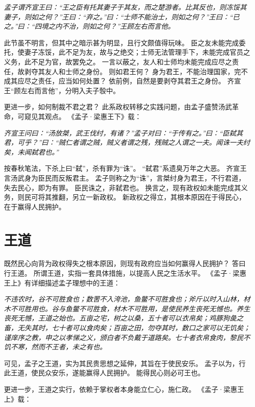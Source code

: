 \documentclass[11pt]{article}
\begin{document}
\textit{孟子谓齐宣王曰：“王之臣有托其妻子于其友，而之楚游者。比其反也，则冻馁其妻子，则如之何？”王曰：“弃之。”曰：“士师不能治士，则如之何？”王曰：“已之。”曰：“四境之内不治，则如之何？”王顾左右而言他。}

此节虽不明言，但其中之暗示甚为明显，且行文颇值得玩味。
臣之友未能完成委托，使妻子冻馁，此不足为友，故与之绝交；士师无法管理手下，未能完成官员之义务，此不足为官，故罢免之。
一言以蔽之，友人和士师均未能完成应尽之责任，故剥夺其友人和士师之身份。
则如君王何？
身为君王，不能治理国家，完不成其应尽之责任，应当如何处置？
依前例，自然是要剥夺其君王之身份。
齐宣王“顾左右而言他”，分明入夫子彀中。

\par

更进一步，如何制裁不君之君？
此系政权转移之实践问题，由孟子盛赞汤武革命，可窥见其观点。
《孟子·梁惠王下》载：

\textit{齐宣王问曰：“汤放桀，武王伐纣，有诸？”孟子对曰：“于传有之。”曰：“臣弑其君，可乎？”曰：“贼仁者谓之贼，贼义者谓之残，残贼之人谓之一夫。闻诛一夫纣矣，未闻弑君也。”}

按春秋笔法，下杀上曰“弑”，杀有罪为“诛”。
“弑君”系遗臭万年之大恶。
齐宣王言汤武身为臣民而反叛君主。
孟子则称之为“诛”，言桀纣身为君王，不行君道，失去民心，即为有罪。
臣民诛之，非弑君也。
换言之，现有政权如未能完成其义务，则民可将其推翻，另立一新政权。
新政权之得立，其根本原因在于得民心，在于赢得人民拥护。
  
\section{王道}
既然民心向背为政权得失之根本原因，则现有政府应当如何赢得人民拥护？
答曰行王道。
所谓王道，实指一套具体措施，以提高人民之生活水平。
《孟子·梁惠王上》有详细描述孟子理想中的王道：
  
\textit{不违农时，谷不可胜食也；数罟不入洿池，鱼鳖不可胜食也；斧斤以时入山林，材木不可胜用也。谷与鱼鳖不可胜食，材木不可胜用，是使民养生丧死无憾也。养生丧死无憾，王道之始也。五亩之宅，树之以桑，五十者可以衣帛矣；鸡豚狗彘之畜，无失其时，七十者可以食肉矣；百亩之田，勿夺其时，数口之家可以无饥矣；谨庠序之教，申之以孝悌之义，颁白者不负戴于道路矣。七十者衣帛食肉，黎民不饥不寒，然而不王者，未之有也。}

可见，孟子之王道，实为其民贵思想之延伸，其旨在于使民安乐。
孟子以为，行此王道，使民众安乐，遂能赢得人民拥护。
能得民心则必可王也。

\par

更进一步，王道之实行，依赖于掌权者本身能立仁心，施仁政。
《孟子·梁惠王上》载：
\end{document}
